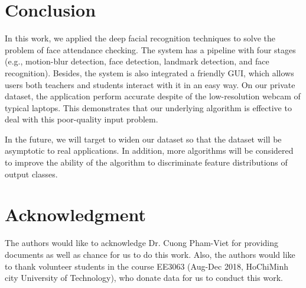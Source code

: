 \documentclass[journal, twocolumn]{IEEEtran}
\begin{document}
\section{Conclusion}
\label{conclusion}

In this work, we applied the deep facial recognition techniques to solve the problem of face attendance checking. The system has a pipeline with four stages (e.g., motion-blur detection, face detection, landmark detection, and face recognition). Besides, the system is also integrated a friendly GUI, which allows users both teachers and students interact with it in an easy way. On our private dataset, the application perform accurate despite of the low-resolution webcam of typical laptops. This demonstrates that our underlying algorithm is effective to deal with this poor-quality input problem.

In the future, we will target to widen our dataset so that the dataset will be asymptotic to real applications. In addition, more algorithms will be considered to improve the ability of the algorithm to discriminate feature distributions of output classes.


\section*{Acknowledgment}

The authors would like to acknowledge Dr. Cuong Pham-Viet for providing documents as well as chance for us to do this work. Also, the authors would like to thank volunteer students in the course EE3063 (Aug-Dec 2018, HoChiMinh city University of Technology), who donate data for us to conduct this work.


\begin{thebibliography}{9}

\end{thebibliography}
\end{document}
